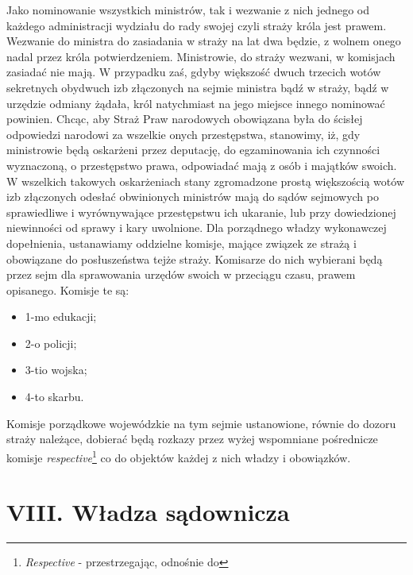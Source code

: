 \documentclass{book}
\begin{document}
 Jako nominowanie wszystkich ministrów, tak i wezwanie z nich jednego od każdego administracji wydziału do rady swojej czyli straży króla jest prawem.  Wezwanie do ministra do zasiadania w straży na lat dwa będzie, z wolnem onego nadal przez króla potwierdzeniem.  Ministrowie, do straży wezwani, w komisjach zasiadać nie mają.  W przypadku zaś, gdyby większość dwuch trzecich wotów sekretnych obydwuch izb złączonych na sejmie ministra bądź w straży, bądź w urzędzie odmiany żądała,  król natychmiast na jego miejsce innego nominować powinien.  Chcąc, aby Straż Praw narodowych obowiązana była do ścisłej odpowiedzi narodowi za wszelkie onych przestępstwa, stanowimy, iż, gdy ministrowie będą oskarżeni przez deputację,  do egzaminowania ich czynności wyznaczoną, o przestępstwo prawa, odpowiadać mają z osób i majątków swoich.  W wszelkich takowych oskarżeniach stany zgromadzone prostą większością wotów izb złączonych odesłać obwinionych ministrów mają do sądów sejmowych po sprawiedliwe i wyrównywające przestępstwu ich ukaranie,  lub przy dowiedzionej niewinności od sprawy i kary uwolnione.  Dla porządnego władzy wykonawczej dopełnienia, ustanawiamy oddzielne komisje, mające związek ze strażą i obowiązane do posłuszeństwa tejże straży.  Komisarze do nich wybierani będą przez sejm dla sprawowania urzędów swoich w przeciągu czasu, prawem opisanego.  Komisje te są: 
\begin{itemize}
\item 1-mo edukacji; 
\item 2-o policji; 
\item 3-tio wojska; 
\item 4-to skarbu. 
\end{itemize}
Komisje porządkowe wojewódzkie na tym sejmie ustanowione, równie do dozoru straży należące, dobierać będą rozkazy przez wyżej wspomniane pośrednicze komisje \textit{respective}\footnote{\textit{Respective} - przestrzegając, odnośnie do} co do objektów każdej z nich władzy i obowiązków.   

 
\section*{VIII. Władza sądownicza}
\end{document}
